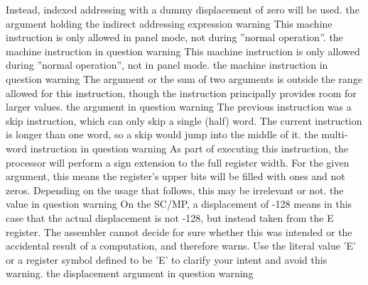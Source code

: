 \documentclass[12pt,twoside]{report}
\begin{document}
\begin{description}
{                Instead, indexed addressing with a dummy displacement of
                zero will be used.}
               {the argument holding the indirect addressing expression}
               {warning}
               {This machine instruction is only allowed in panel mode,
                not during ''normal operation''.}
               {the machine instruction in question}
               {warning}
               {This machine instruction is only allowed during ''normal
                operation'', not in panel mode.}
               {the machine instruction in question}
               {warning}
               {The argument or the sum of two arguments is outside the
                range allowed for this instruction, though the instruction
                principally provides room for larger values.}
               {the argument in question}
               {warning}
               {The previous instruction was a skip instruction, which
                can only skip a single (half) word.  The current instruction
                is longer than one word, so a skip would jump into the middle
                of it.}
               {the multi-word instruction in question}
               {warning}
               {As part of executing this instruction, the processor will
                perform a sign extension to the full register width.  For the
                given argument, this means the register's upper bits will be
                filled with ones and not zeros.  Depending on the usage that
                follows, this may be irrelevant or not.}
               {the value in question}
               {warning}
               {On the SC/MP, a displacement of -128 means in this case that
                the actual displacement is not -128, but instead taken from
                the E register.  The assembler cannot decide for sure whether
                this was intended or the accidental result of a computation,
                and therefore warns.  Use the literal value 'E' or a register
                symbol defined to be 'E' to clarify your intent and avoid
                this warning.}
               {the displacement argument in question}
               {warning}

\end{description}
\end{document}
